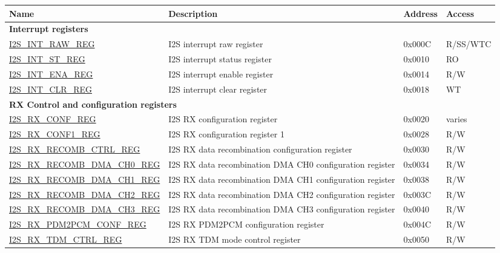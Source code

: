 \begin{longtable}{ | p{6cm} | p{6.8cm} | p{1.3cm} | p{1.4cm} | }
\hline\rowcolor{lightgray}
\textbf{Name} & \textbf{Description} &  \textbf{Address} & \textbf{Access} \\ \hline
\endhead
\multicolumn{4}{|l|}{\textbf{Interrupt registers}} \\ \hline
\hyperref[regdesc:I2SINTRAWREG]{I2S\_INT\_RAW\_REG} & I2S interrupt raw register & 0x000C & R/SS/WTC \\ \hline
\hyperref[regdesc:I2SINTSTREG]{I2S\_INT\_ST\_REG} & I2S interrupt status register & 0x0010 & RO \\ \hline
\hyperref[regdesc:I2SINTENAREG]{I2S\_INT\_ENA\_REG} & I2S interrupt enable register & 0x0014 & R/W \\ \hline
\hyperref[regdesc:I2SINTCLRREG]{I2S\_INT\_CLR\_REG} & I2S interrupt clear register & 0x0018 & WT \\ \hline
\multicolumn{4}{|l|}{\textbf{RX Control and configuration registers}} \\ \hline
\hyperref[regdesc:I2SRXCONFREG]{I2S\_RX\_CONF\_REG} & I2S RX configuration register & 0x0020 & varies \\ \hline
\hyperref[regdesc:I2SRXCONF1REG]{I2S\_RX\_CONF1\_REG} & I2S RX configuration register 1 & 0x0028 & R/W \\ \hline
\hyperref[regdesc:I2SRXRECOMBCTRLREG]{I2S\_RX\_RECOMB\_CTRL\_REG} & I2S RX data recombination configuration register & 0x0030 & R/W \\ \hline
\hyperref[regdesc:I2SRXRECOMBDMACH0REG]{I2S\_RX\_RECOMB\_DMA\_CH0\_REG} & I2S RX data recombination DMA CH0 configuration register & 0x0034 & R/W \\ \hline
\hyperref[regdesc:I2SRXRECOMBDMACH1REG]{I2S\_RX\_RECOMB\_DMA\_CH1\_REG} & I2S RX data recombination DMA CH1 configuration register & 0x0038 & R/W \\ \hline
\hyperref[regdesc:I2SRXRECOMBDMACH2REG]{I2S\_RX\_RECOMB\_DMA\_CH2\_REG} & I2S RX data recombination DMA CH2 configuration register & 0x003C & R/W \\ \hline
\hyperref[regdesc:I2SRXRECOMBDMACH3REG]{I2S\_RX\_RECOMB\_DMA\_CH3\_REG} & I2S RX data recombination DMA CH3 configuration register & 0x0040 & R/W \\ \hline
\hyperref[regdesc:I2SRXPDM2PCMCONFREG]{I2S\_RX\_PDM2PCM\_CONF\_REG} & I2S RX PDM2PCM configuration register & 0x004C & R/W \\ \hline
\hyperref[regdesc:I2SRXTDMCTRLREG]{I2S\_RX\_TDM\_CTRL\_REG} & I2S RX TDM mode control register & 0x0050 & R/W \\ \hline

\end{longtable}

